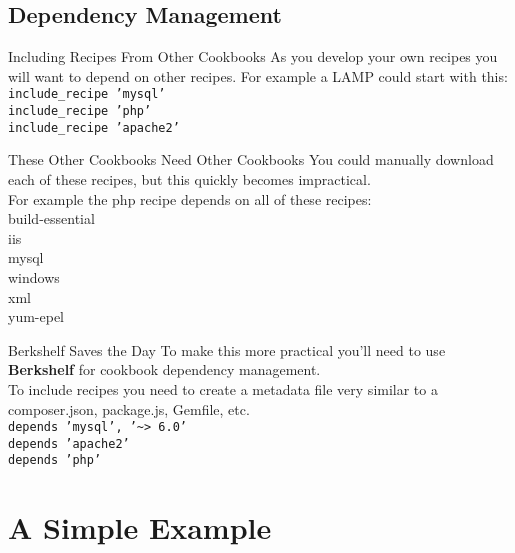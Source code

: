 \documentclass{beamer}
\begin{document}
    \subsection{Dependency Management}
    \begin{frame}{Including Recipes From Other Cookbooks}
        As you develop your own recipes you will want to depend on other recipes.  For example a LAMP could start with this:
        \medskip
        \texttt{
            include\_recipe 'mysql'\\
            include\_recipe 'php'\\
            include\_recipe 'apache2'\\
        }
    \end{frame}
    \begin{frame}{These Other Cookbooks Need Other Cookbooks}
        You could manually download each of these recipes, but this quickly becomes impractical.\\
        \bigskip
        For example the php recipe depends on all of these recipes:\\
        build-essential\\
        iis\\
        mysql\\
        windows\\
        xml\\
        yum-epel\\
    \end{frame}
    \begin{frame}{Berkshelf Saves the Day}
        To make this more practical you'll need to use \textbf{Berkshelf} for cookbook dependency management.\\
        To include recipes you need to create a metadata file very similar to a composer.json, package.js, Gemfile, etc.\\
        \medskip
        \texttt{depends 'mysql', '\textasciitilde> 6.0'\\
            depends 'apache2'\\
            depends 'php'\\
        }
    \end{frame}
    \section{A Simple Example}
\end{document}
